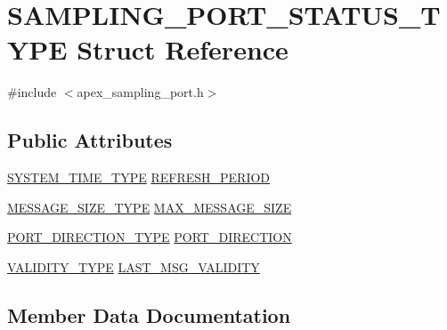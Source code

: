 \hypertarget{structSAMPLING__PORT__STATUS__TYPE}{}\section{S\+A\+M\+P\+L\+I\+N\+G\+\_\+\+P\+O\+R\+T\+\_\+\+S\+T\+A\+T\+U\+S\+\_\+\+T\+Y\+PE Struct Reference}
\label{structSAMPLING__PORT__STATUS__TYPE}


{\ttfamily \#include $<$apex\+\_\+sampling\+\_\+port.\+h$>$}

\subsection*{Public Attributes}
\begin{DoxyCompactItemize}
\item 
\hyperlink{apex__types_8h_a78cd52c2621ddf2eda68fcd4bedbc1a7}{S\+Y\+S\+T\+E\+M\+\_\+\+T\+I\+M\+E\+\_\+\+T\+Y\+PE} \hyperlink{structSAMPLING__PORT__STATUS__TYPE_af01743f2cd919f7d8198a758160f3e58}{R\+E\+F\+R\+E\+S\+H\+\_\+\+P\+E\+R\+I\+OD}
\item 
\hyperlink{apex__types_8h_ae09494a8d78c38c94f0cc5a80e69785a}{M\+E\+S\+S\+A\+G\+E\+\_\+\+S\+I\+Z\+E\+\_\+\+T\+Y\+PE} \hyperlink{structSAMPLING__PORT__STATUS__TYPE_ae49173e0a2e3f323ec8efdeea883971d}{M\+A\+X\+\_\+\+M\+E\+S\+S\+A\+G\+E\+\_\+\+S\+I\+ZE}
\item 
\hyperlink{apex__types_8h_ae82fcf2f7f6f7966d59d9569049531a4}{P\+O\+R\+T\+\_\+\+D\+I\+R\+E\+C\+T\+I\+O\+N\+\_\+\+T\+Y\+PE} \hyperlink{structSAMPLING__PORT__STATUS__TYPE_ae9fbcccaa93fd7f7c811a4e8374933af}{P\+O\+R\+T\+\_\+\+D\+I\+R\+E\+C\+T\+I\+ON}
\item 
\hyperlink{apex__sampling__port_8h_a00855980da372cfa6572e3e3f57ef499}{V\+A\+L\+I\+D\+I\+T\+Y\+\_\+\+T\+Y\+PE} \hyperlink{structSAMPLING__PORT__STATUS__TYPE_ab1b26afc9953625980d046f415ed6d23}{L\+A\+S\+T\+\_\+\+M\+S\+G\+\_\+\+V\+A\+L\+I\+D\+I\+TY}
\end{DoxyCompactItemize}


\subsection{Member Data Documentation}
